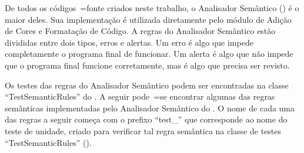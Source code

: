 De todos os códigos~=fonte criados neste trabalho,
o Analisador Semântico () é o maior deles.
Sua implementação é utilizada diretamente pelo módulo de Adição de Cores e
Formatação de Código.
A regras do Analisador Semântico estão divididas entre dois tipos,
erros e
alertas.
Um erro é algo que impede completamente o programa final de funcionar.
Um alerta é algo que não impede que o programa final funcione corretamente,
mas é algo que precisa ser revisto.

Os testes das regras do Analisador Semântico podem ser encontradas na classe ``TestSemanticRules'' do .
A seguir pode~=se encontrar algumas das regras semânticas implementadas pelo Analisador Semântico do .
O nome de cada uma das regras a seguir começa com o prefixo ``test\_'' que corresponde ao nome do teste de unidade,
criado para verificar tal regra semântica na classe de testes ``TestSemanticRules'' ().
